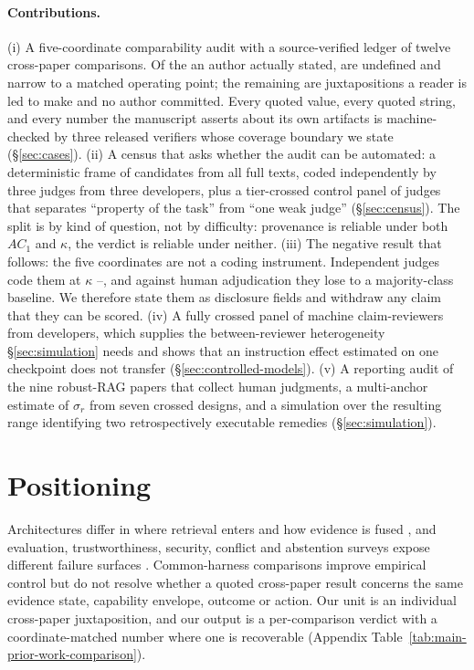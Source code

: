 \documentclass[11pt]{article}
\begin{document}
\paragraph{Contributions.}
(i) A five-coordinate comparability audit with a source-verified ledger of
twelve cross-paper comparisons. Of the \LedgerStated{} an author actually
stated, \LedgerStatedUndef{} are undefined and \LedgerStatedNarrow{} narrow to
a matched operating point; the remaining \LedgerInvited{} are juxtapositions a
reader is led to make and no author committed. Every quoted value, every quoted
string, and every number the manuscript asserts about its own artifacts is
machine-checked by three released verifiers whose coverage boundary we state
(\S\ref{sec:cases}). (ii) A census that asks whether the audit can be
automated: a deterministic frame of \FrameCandidates{} candidates from all
\FrameScreened{} full texts, coded independently by three judges from three
developers, plus a tier-crossed control panel of \TierPanelN{} judges that
separates ``property of the task'' from ``one weak judge''
(\S\ref{sec:census}). The split is by kind of question, not by difficulty:
provenance is reliable under both $AC_1$ and $\kappa$, the verdict is reliable
under neither. (iii) The negative result that follows: the five coordinates are
not a coding instrument. Independent judges code them at $\kappa$
\DecCoordKMin{}--\DecCoordKMax{}, and against human adjudication they lose to a
majority-class baseline. We therefore state them as disclosure fields and
withdraw any claim that they can be scored. (iv) A fully crossed panel of
\CMJmodels{} machine claim-reviewers from \CMJdevelopers{} developers, which
supplies the between-reviewer heterogeneity \S\ref{sec:simulation} needs and
shows that an instruction effect estimated on one checkpoint does not transfer
(\S\ref{sec:controlled-models}). (v) A reporting audit of the nine robust-RAG
papers that collect human judgments, a multi-anchor estimate of $\sigma_r$ from
seven crossed designs, and a simulation over the resulting range identifying
two retrospectively executable remedies (\S\ref{sec:simulation}).

\section{Positioning}
\label{sec:related}

Architectures differ in where retrieval enters and how evidence is fused
\citep{drqa2017,knnlm2020,fid2021,retro2022,atlas2023,replug2024}, and
evaluation, trustworthiness, security, conflict and abstention surveys expose
different failure surfaces \citep{ragSurvey2024,ragEvaluationSurvey2024,
trustRAGCompass2024,securityRAGSurvey2026,xuKnowledgeConflicts2024,
wenAbstentionSurvey2025}. Common-harness comparisons improve empirical control
\citep{ragBestPractices2024,alushiRAGComparison2026} but do not resolve whether
a quoted cross-paper result concerns the same evidence state, capability
envelope, outcome or action. Our unit is an individual cross-paper
juxtaposition, and our output is a per-comparison verdict with a
coordinate-matched number where one is recoverable (Appendix
Table~\ref{tab:main-prior-work-comparison}).
\end{document}
